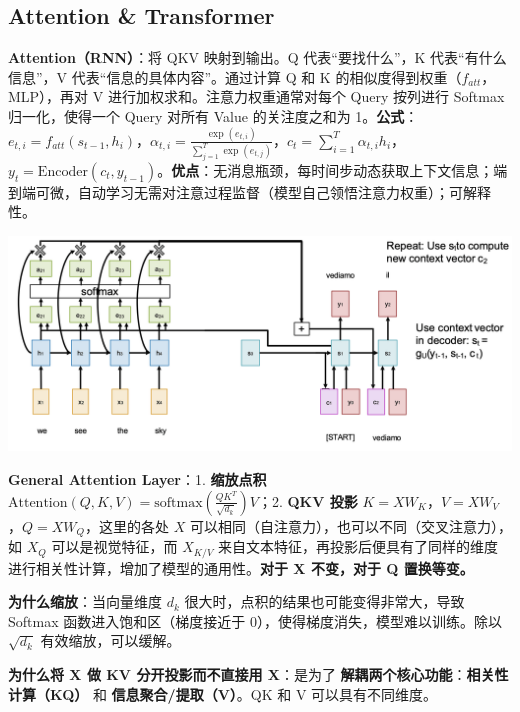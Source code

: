 \documentclass[
  8pt]{extarticle}
\begin{document}
\begin{multicols*}{4}
\hypertarget{attention-transformer}{%
\section{Attention \& Transformer}\label{attention-transformer}}

\textbf{Attention（RNN）}：将 QKV 映射到输出。Q 代表``要找什么''，K
代表``有什么信息''，V 代表``信息的具体内容''。通过计算 Q 和 K
的相似度得到权重（\(f_{att}\)，MLP），再对 V
进行加权求和。注意力权重通常对每个 Query 按列进行 Softmax
归一化，使得一个 Query 对所有 Value 的关注度之和为
1。\textbf{公式}：\(e_{t,i} = f_{att}(s_{t-1}, h_i)\)，\(\alpha_{t,i} = \frac{\exp(e_{t,i})}{\sum_{j=1}^{T} \exp(e_{t,j})}\)，\(c_t = \sum_{i=1}^{T} \alpha_{t,i} h_i\)，\(y_t = \text{Encoder}(c_t, y_{t-1})\)。\textbf{优点}：无消息瓶颈，每时间步动态获取上下文信息；端到端可微，自动学习无需对注意过程监督（模型自己领悟注意力权重）；可解释性。

\includegraphics{./Cheatsheet-02-Self-Attention-and-Transformer.assets/image-20250618024935220.png}

\textbf{General Attention Layer}：1. \textbf{缩放点积}
\(\text{Attention}(Q, K, V) = \text{softmax}\left(\frac{QK^T}{\sqrt{d_k}}\right)V\)；2.
\textbf{QKV 投影} \(K = XW_K\)，\(V = XW_V\)，\(Q = XW_Q\)，这里的各处
\(X\) 可以相同（自注意力），也可以不同（交叉注意力），如 \(X_{Q}\)
可以是视觉特征，而 \(X_{K/V}\)
来自文本特征，再投影后便具有了同样的维度进行相关性计算，增加了模型的通用性。\textbf{对于
X 不变，对于 Q 置换等变。}

\textbf{为什么缩放}：当向量维度 \(d_k\)
很大时，点积的结果也可能变得非常大，导致 Softmax
函数进入饱和区（梯度接近于 0），使得梯度消失，模型难以训练。除以
\(\sqrt{d_k}\) 有效缩放，可以缓解。

\textbf{为什么将 X 做 KV 分开投影而不直接用 X}：是为了
\textbf{解耦两个核心功能}：\textbf{相关性计算（KQ）} 和
\textbf{信息聚合/提取（V）}。QK 和 V 可以具有不同维度。


\end{multicols*}
\end{document}

